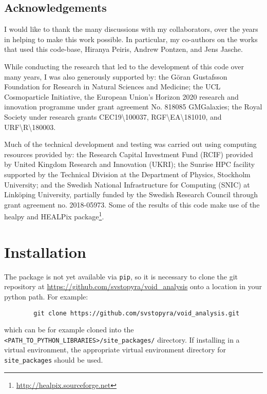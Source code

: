 \documentclass{article}
\newcommand{\codefont}[1]{{\texttt{#1}}}
\begin{document}
	\subsection{Acknowledgements}
	
	I would like to thank the many discussions with my collaborators, over the years in helping to make this work possible. In particular, my co-authors on the works that used this code-base, Hiranya Peiris, Andrew Pontzen, and Jens Jasche. 
	
	While conducting the research that led to the development of this code over many years, I was also generously supported by: the Göran Gustafsson Foundation for Research in Natural Sciences and Medicine; the UCL Cosmoparticle Initiative, the European Union’s Horizon 2020 research and innovation programme under grant agreement No. 818085 GMGalaxies; the Royal Society under research grants CEC19\textbackslash 100037, RGF\textbackslash EA\textbackslash181010, and URF\textbackslash R\textbackslash180003. 
	
	Much of the technical development and testing was carried out using computing resources provided by: the Research Capital Investment Fund (RCIF) provided by United Kingdom Research and Innovation (UKRI); the Sunrise HPC facility supported by the Technical Division at the Department of Physics, Stockholm University; and the Swedish National Infrastructure for Computing (SNIC) at Linköping University, partially funded by the Swedish Research Council through grant agreement no. 2018-05973. Some of the results of this code make use of the healpy and HEALPix package\footnote{\url{http://healpix.sourceforge.net}}. 
	
	\section{Installation}
	
	The package is not yet available via \codefont{pip}, so it is necessary to clone the git repository at \url{https://github.com/svstopyra/void_analysis} onto a location in your python path. For example:
	
	\begin{verbatim}
		git clone https://github.com/svstopyra/void_analysis.git
	\end{verbatim}
	which can be for example cloned into the \codefont{<PATH\_TO\_PYTHON\_LIBRARIES>/site\_packages/} directory. If installing in a virtual environment, the appropriate virtual environment directory for \codefont{site\_packages} should be used.
	
\end{document}
